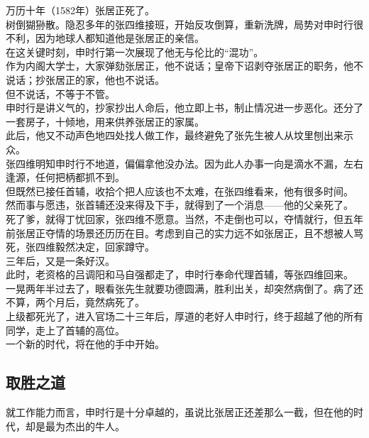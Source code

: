 \begin{multicols}{\theparacolNo}
万历十年（1582年）张居正死了。\\

树倒猢狲散。隐忍多年的张四维接班，开始反攻倒算，重新洗牌，局势对申时行很不利，因为地球人都知道他是张居正的亲信。\\

在这关键时刻，申时行第一次展现了他无与伦比的“混功”。\\

作为内阁大学士，大家弹劾张居正，他不说话；皇帝下诏剥夺张居正的职务，他不说话；抄张居正的家，他也不说话。\\

但不说话，不等于不管。\\

申时行是讲义气的，抄家抄出人命后，他立即上书，制止情况进一步恶化。还分了一套房子，十倾地，用来供养张居正的家属。\\

此后，他又不动声色地四处找人做工作，最终避免了张先生被人从坟里刨出来示众。\\

张四维明知申时行不地道，偏偏拿他没办法。因为此人办事一向是滴水不漏，左右逢源，任何把柄都抓不到。\\

但既然已接任首辅，收拾个把人应该也不太难，在张四维看来，他有很多时间。\\

然而事与愿违，张首辅还没来得及下手，就得到了一个消息——他的父亲死了。\\

死了爹，就得丁忧回家，张四维不愿意。当然，不走倒也可以，夺情就行，但五年前张居正夺情的场景还历历在目。考虑到自己的实力远不如张居正，且不想被人骂死，张四维毅然决定，回家蹲守。\\

三年后，又是一条好汉。\\

此时，老资格的吕调阳和马自强都走了，申时行奉命代理首辅，等张四维回来。\\

一晃两年半过去了，眼看张先生就要功德圆满，胜利出关，却突然病倒了。病了还不算，两个月后，竟然病死了。\\

上级都死光了，进入官场二十三年后，厚道的老好人申时行，终于超越了他的所有同学，走上了首辅的高位。\\

一个新的时代，将在他的手中开始。\\

\subsection{取胜之道}
就工作能力而言，申时行是十分卓越的，虽说比张居正还差那么一截，但在他的时代，却是最为杰出的牛人。\\


\end{multicols}

